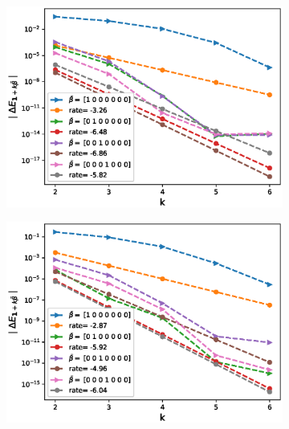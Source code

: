 \begin{figure}[htb]
\begin{subfigure}{0.4\textwidth}
		\caption{}
		\label{fig:2}
	\end{subfigure}\hfil %
	\begin{subfigure}{0.4\textwidth}
		\includegraphics[width=\linewidth]{./figures/Heston_single_call_QE_moment_matching/mixed_rates/set2/N_4/first_difference_heston_4steps_hierarchical}
		\caption{}
		\label{fig:3}
	\end{subfigure}
		\begin{subfigure}{0.4\textwidth}
		\includegraphics[width=\linewidth]{./figures/Heston_single_call_smooth_vol/mixed_rates/set2/N_4/first_difference_heston_4steps_spot_hierarchical_2}
		\caption{}
		\label{fig:4}
	\end{subfigure}

\end{figure}
